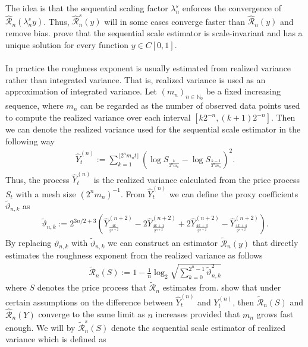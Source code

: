 \documentclass{article}
\begin{document}
The idea is that the sequential scaling factor $\lambda_n^s$ enforces the convergence of $\hat{\mathscr{R}}_n (\lambda_n^s y)$. Thus, $\hat{\mathscr{R}}_n^s (y)$ will in some cases converge faster than $\hat{\mathscr{R}}_n (y)$ and remove bias. \cite{han} prove that the sequential scale estimator is scale-invariant and has a unique solution for every function $y\in C[0,1]$.\\\\
In practice the roughness exponent is usually estimated from realized variance rather than integrated variance. That is, realized variance is used as an approximation of integrated variance. Let $(m_n)_{n\in \mathbb{N}_0}$ be a fixed increasing sequence, where $m_n$ can be regarded as the number of observed data points used to compute the realized variance over each interval $[k2^{-n},(k+1)2^{-n}]$. Then we can denote the realized variance used for the sequential scale estimator in the following way
\begin{align}
\widehat{Y}_t^{(n)} := \sum_{k=1}^{\lfloor 2^nm_nt \rfloor} \left( \log S_{\frac{k}{2^n m_n}} - \log S_{\frac{k-1}{2^n m_n}}\right)^2 . \label{eq:rvforscale}
\end{align}
Thus, the process $\widehat{Y}_t^{(n)}$ is the realized variance calculated from the price process $S_t$ with a mesh size $(2^nm_n)^{-1}$. From $\widehat{Y}_t^{(n)}$ we can define the proxy coefficients $\widetilde{\vartheta}_{n,k}$ as
\begin{align*}
\widetilde{\vartheta}_{n,k} := 2^{3n/2+3} \left( 
\widehat{Y}_{ \frac{4k}{2^{n+2}}}^{(n+2)}
- 2\widehat{Y}_{\frac{4k+1}{2^{n+2}}}^{(n+2)}
+ 2\widehat{Y}_{\frac{4k+3}{2^{n+2}}}^{(n+2)} 
- \widehat{Y}_{\frac{4k+4}{2^{n+2}}}^{(n+2)} 
\right).
\end{align*}
By replacing $\vartheta_{n,k}$ with $\widetilde{\vartheta}_{n,k}$ we can construct an estimator $\widetilde{\mathscr{R}}_n (y)$ that directly estimates the roughness exponent from the realized variance as follows
\begin{align*}
\widetilde{\mathscr{R}}_n (S) := 1 - \frac{1}{n}\log_2 \sqrt{\sum_{k=0}^{2^n-1}\widetilde{\vartheta}_{n,k}^2}
\end{align*}
where $S$ denotes the price process that $\widetilde{\mathscr{R}}_n$ estimates from. \cite{han} show that under certain assumptions on the difference between $\widehat{Y}_t^{(n)}$ and $Y_t^{(n)}$, then $\widetilde{\mathscr{R}}_n (S)$ and $\hat{\mathscr{R}}_n (Y)$ converge to the same limit as $n$ increases provided that $m_n$ grows fast enough. We will by $\widetilde{\mathscr{R}}_n^s (S)$ denote the sequential scale estimator of realized variance which is defined as
\end{document}
